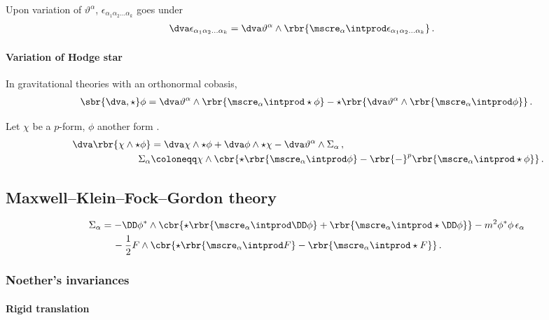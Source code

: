 \documentclass[a4paper]{article}
\begin{document}
Upon variation of $\vartheta^{\alpha}$, $\epsilon_{\alpha_{1}\alpha_{2}\ldots 
\alpha_{k}}$ goes under \cite[sec.\ A.2]{Muench1998}
\begin{align}
\dva \epsilon_{\alpha_{1}\alpha_{2}\ldots \alpha_{k}} &=
\dva \vartheta^{\alpha} \wedge \rbr{\mscre_{\alpha}\intprod 
	\epsilon_{\alpha_{1}\alpha_{2}\ldots \alpha_{k}}}\,.
\end{align}

\paragraph{Variation of Hodge star}
In gravitational theories \cite[sec.\ 3.2]{Muench1998} with an orthonormal 
cobasis,
\begin{align}
\sbr{\dva, \star}\phi = 
\dva\vartheta^{\alpha}\wedge\rbr{\mscre_{\alpha}\intprod\star\phi} -
\star\rbr{\dva\vartheta^{\alpha}\wedge\rbr{\mscre_{\alpha}\intprod\phi}}\,.
\end{align}

Let $\chi$ be a $p$-form, $\phi$ another form \cite[sec.\ 5]{Itin1999}.
\begin{align}\
\dva\rbr{\chi\wedge\star\phi} &=
\dva \chi \wedge \star \phi + \dva \phi \wedge \star \chi -
	\dva \vartheta^{\alpha} \wedge \Sigma_{\alpha}\,,
\\
\Sigma_{\alpha} &\coloneqq \chi \wedge \cbr{
	\star\rbr{\mscre_{\alpha}\intprod\phi} -
	\rbr{-}^{p} \rbr{\mscre_{\alpha}\intprod\star\phi}}\,.
\end{align}

\subsection{Maxwell--Klein--Fock--Gordon theory}


\begin{align}
\begin{split}
\Sigma_{\alpha} &=
	-\DD\phi^* \wedge \cbr{\star\rbr{\mscre_{\alpha}\intprod \DD\phi} +
		\rbr{\mscre_{\alpha}\intprod\star\DD\phi}}
-m^2\phi^*\phi\,\epsilon_{\alpha}
\\
&\quad\,
- \frac{1}{2} F \wedge \cbr{\star\rbr{\mscre_{\alpha}\intprod F} -
		\rbr{\mscre_{\alpha}\intprod \star F}}\,.
\end{split}
\end{align}

\subsubsection{Noether's invariances}
\cite{Avery2015}

\paragraph{Rigid translation}

%


\printbibliography
\end{document}
